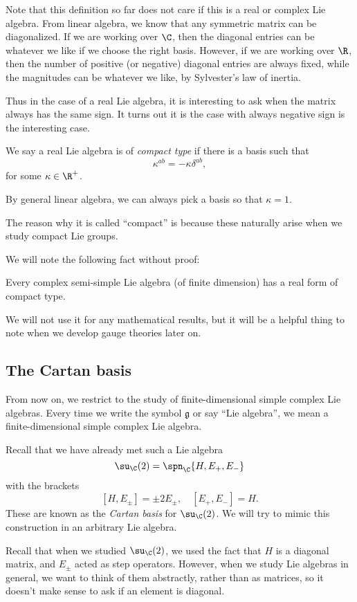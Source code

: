\documentclass[a4paper]{article}
\begin{document}
Note that this definition so far does not care if this is a real or complex Lie algebra. From linear algebra, we know that any symmetric matrix can be diagonalized. If we are working over $\C$, then the diagonal entries can be whatever we like if we choose the right basis. However, if we are working over $\R$, then the number of positive (or negative) diagonal entries are always fixed, while the magnitudes can be whatever we like, by Sylvester's law of inertia.

Thus in the case of a real Lie algebra, it is interesting to ask when the matrix always has the same sign. It turns out it is the case with always negative sign is the interesting case.

\begin{defi}
  We say a real Lie algebra is of \emph{compact type} if there is a basis such that
  \[
    \kappa^{ab} = - \kappa \delta^{ab},
  \]
  for some $\kappa \in \R^+$.
\end{defi}
By general linear algebra, we can always pick a basis so that $\kappa = 1$.

The reason why it is called ``compact'' is because these naturally arise when we study compact Lie groups.

We will note the following fact without proof:
\begin{thm}
  Every complex semi-simple Lie algebra (of finite dimension) has a real form of compact type.
\end{thm}
We will not use it for any mathematical results, but it will be a helpful thing to note when we develop gauge theories later on.

\subsection{The Cartan basis}
From now on, we restrict to the study of finite-dimensional simple complex Lie algebras. Every time we write the symbol $\mathfrak{g}$ or say ``Lie algebra'', we mean a finite-dimensional simple complex Lie algebra.

Recall that we have already met such a Lie algebra
\[
  \su_\C(2) = \spn_\C \{H, E_+, E_-\}
\]
with the brackets
\[
  [H, E_{\pm}] = \pm 2E_{\pm},\quad [E_+, E_-] = H.
\]
These are known as the \emph{Cartan basis} for $\su_\C(2)$. We will try to mimic this construction in an arbitrary Lie algebra.

Recall that when we studied $\su_\C(2)$, we used the fact that $H$ is a diagonal matrix, and $E_{\pm}$ acted as step operators. However, when we study Lie algebras in general, we want to think of them abstractly, rather than as matrices, so it doesn't make sense to ask if an element is diagonal.
\end{document}
